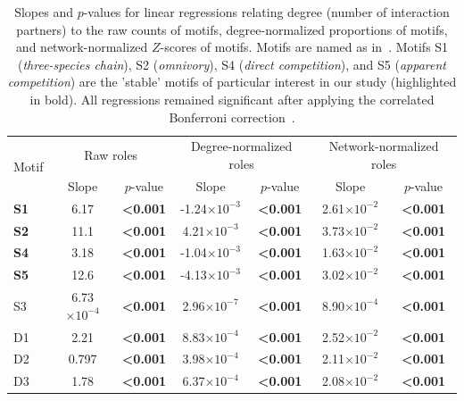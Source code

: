 \documentclass[12pt]{article}
\begin{document}
    \begin{table}[h!]
        \caption{Slopes and $p$-values for linear regressions relating degree (number of interaction partners) to the raw counts of motifs, degree-normalized proportions of motifs, and network-normalized $Z$-scores of motifs. Motifs are named as in~\citet{Stouffer2007}. Motifs S1 (\emph{three-species chain}), S2 (\emph{omnivory}), S4 (\emph{direct competition}), and S5 (\emph{apparent competition}) are the 'stable' motifs of particular interest in our study (highlighted in bold). All regressions remained significant after applying the correlated Bonferroni correction~\citep{Drezner2016}.}
        \label{degree_lms}
        \begin{tabular}{l | c c c c c c }
        \multirow{2}{*}{Motif} & \multicolumn{2}{c}{Raw roles} & \multicolumn{2}{c}{Degree-normalized roles} & \multicolumn{2}{c}{Network-normalized roles} \\
        & Slope & $p$-value & Slope & $p$-value & Slope & $p$-value \\
        \hline
        \textbf{S1}	&	6.17	&	\textbf{\textless0.001}	& -1.24$\times10^{-3}$	&	\textbf{\textless0.001}	&	2.61$\times10^{-2}$	&	\textbf{\textless0.001}	\\
        \textbf{S2}	&	11.1	&	\textbf{\textless0.001}	& 4.21$\times10^{-3}$	&	\textbf{\textless0.001}	&	3.73$\times10^{-2}$	&	\textbf{\textless0.001}	\\
        \textbf{S4}	&	3.18	&	\textbf{\textless0.001}	& -1.04$\times10^{-3}$	&	\textbf{\textless0.001}	&	1.63$\times10^{-2}$	&	\textbf{\textless0.001}	\\
        \textbf{S5}	&	12.6	&	\textbf{\textless0.001}	& -4.13$\times10^{-3}$	&	\textbf{\textless0.001}	&	3.02$\times10^{-2}$	&	\textbf{\textless0.001}	\\
        \hline
        S3	&	6.73$\times10^{-4}$	&	\textbf{\textless0.001}	&	2.96$\times10^{-7}$	&	\textbf{\textless0.001}	&	8.90$\times10^{-4}$	&	\textbf{\textless0.001}	\\
        D1	&	2.21	&	\textbf{\textless0.001}	&	8.83$\times10^{-4}$	&	\textbf{\textless0.001}	&	2.52$\times10^{-2}$	&	\textbf{\textless0.001}	\\
        D2	&	0.797	&	\textbf{\textless0.001}	&	3.98$\times10^{-4}$	&	\textbf{\textless0.001}	&	2.11$\times10^{-2}$
        	&	\textbf{\textless0.001}	\\
        D3	&	1.78	&	\textbf{\textless0.001}	&	6.37$\times10^{-4}$	&	\textbf{\textless0.001}	&	2.08$\times10^{-2}$	&	\textbf{\textless0.001}	\\

\end{tabular}
\end{table}
\end{document}
